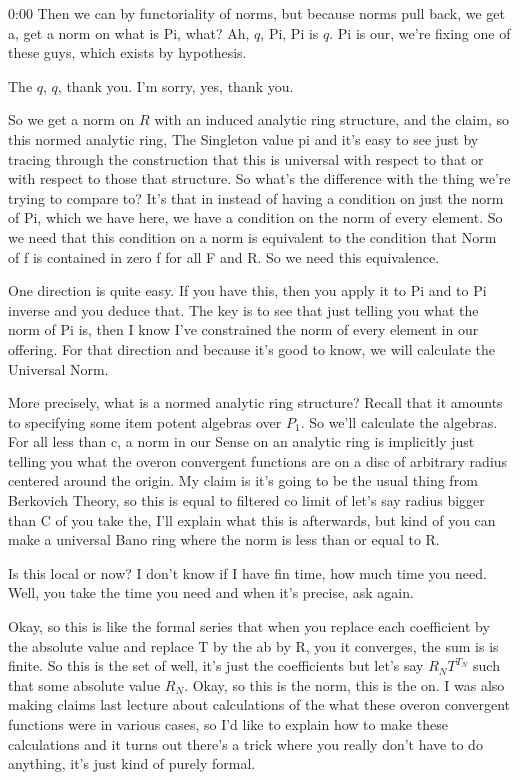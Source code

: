 \begin{unfinished}{0:00}
Then we can by functoriality of norms, but because norms pull back, we get a, get a norm on what is Pi, what? Ah, $q$, Pi, Pi is $q$. Pi is our, we're fixing one of these guys, which exists by hypothesis.

The $q$, $q$, thank you. I'm sorry, yes, thank you.

So we get a norm on $R$ with an induced analytic ring structure, and the claim, so this normed analytic ring,
The Singleton value pi and it's easy to see just by tracing through the construction that this is universal with respect to that or with respect to those that structure. So what's the difference with the thing we're trying to compare to? It's that in instead of having a condition on just the norm of Pi, which we have here, we have a condition on the norm of every element. So we need that this condition on a norm is equivalent to the condition that Norm of f is contained in zero f for all F and R. So we need this equivalence.

One direction is quite easy. If you have this, then you apply it to Pi and to Pi inverse and you deduce that. The key is to see that just telling you what the norm of Pi is, then I know I've constrained the norm of every element in our offering. For that direction and because it's good to know, we will calculate the Universal Norm.

More precisely, what is a normed analytic ring structure? Recall that it amounts to specifying some item potent algebras over $P_1$. So we'll calculate the algebras. For all less than c, a norm in our Sense on an analytic ring is implicitly just telling you what the overon convergent functions are on a disc of arbitrary radius centered around the origin. My claim is it's going to be the usual thing from Berkovich Theory, so this is equal to filtered co limit of let's say radius bigger than C of you take the, I'll explain what this is afterwards, but kind of you can make a universal Bano ring where the norm is less than or equal to R.

Is this local or now? I don't know if I have fin time, how much time you need. Well, you take the time you need and when it's precise, ask again.

Okay, so this is like the formal series that when you replace each coefficient by the absolute value and replace T by the ab by R, you it converges, the sum is is finite. So this is the set of well, it's just the coefficients but let's say $R_N T^{T_N}$ such that some absolute value $R_N$. Okay, so this is the norm, this is the on. I was also making claims last lecture about calculations of the what these overon convergent functions were in various cases, so I'd like to explain how to make these calculations and it turns out there's a trick where you really don't have to do anything, it's just kind of purely formal.


\end{unfinished}
